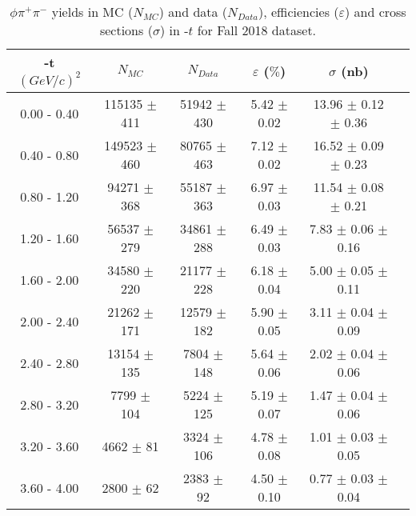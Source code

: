 \begin{center}
\null
\vfill
\begin{table}[H]
    \centering
    \caption{$\phi \pi^{+}\pi^{-}$ yields in MC ($N_{MC}$) and data ($N_{Data}$), efficiencies ($\varepsilon$) and cross sections ($\sigma$) in -$t$ for Fall 2018 dataset.}
    \label{tab.y2175.xsec_ul.phi2pi.4.2}
    \begin{tabular}{|c|c|c|c|c|c|}
    \hline
    -t $(GeV/c)^{2}$ & $N_{MC}$ & $N_{Data}$ & $\varepsilon$ ($\%$) & $\sigma$ (nb) \\ 
    \hline
    0.00 - 0.40 & 115135 $\pm$ 411 & 51942 $\pm$ 430 & 5.42 $\pm$ 0.02 & 13.96 $\pm$ 0.12 $\pm$ 0.36 \\ 
    0.40 - 0.80 & 149523 $\pm$ 460 & 80765 $\pm$ 463 & 7.12 $\pm$ 0.02 & 16.52 $\pm$ 0.09 $\pm$ 0.23 \\ 
    0.80 - 1.20 & 94271 $\pm$ 368 & 55187 $\pm$ 363 & 6.97 $\pm$ 0.03 & 11.54 $\pm$ 0.08 $\pm$ 0.21 \\ 
    1.20 - 1.60 & 56537 $\pm$ 279 & 34861 $\pm$ 288 & 6.49 $\pm$ 0.03 & 7.83 $\pm$ 0.06 $\pm$ 0.16 \\ 
    1.60 - 2.00 & 34580 $\pm$ 220 & 21177 $\pm$ 228 & 6.18 $\pm$ 0.04 & 5.00 $\pm$ 0.05 $\pm$ 0.11 \\ 
    2.00 - 2.40 & 21262 $\pm$ 171 & 12579 $\pm$ 182 & 5.90 $\pm$ 0.05 & 3.11 $\pm$ 0.04 $\pm$ 0.09 \\ 
    2.40 - 2.80 & 13154 $\pm$ 135 & 7804 $\pm$ 148 & 5.64 $\pm$ 0.06 & 2.02 $\pm$ 0.04 $\pm$ 0.06 \\ 
    2.80 - 3.20 & 7799 $\pm$ 104 & 5224 $\pm$ 125 & 5.19 $\pm$ 0.07 & 1.47 $\pm$ 0.04 $\pm$ 0.06 \\ 
    3.20 - 3.60 & 4662 $\pm$ 81 & 3324 $\pm$ 106 & 4.78 $\pm$ 0.08 & 1.01 $\pm$ 0.03 $\pm$ 0.05 \\ 
    3.60 - 4.00 & 2800 $\pm$ 62 & 2383 $\pm$ 92 & 4.50 $\pm$ 0.10 & 0.77 $\pm$ 0.03 $\pm$ 0.04 \\  
   \hline
\end{tabular}
\end{table}
\null
\vfill
\end{center}

